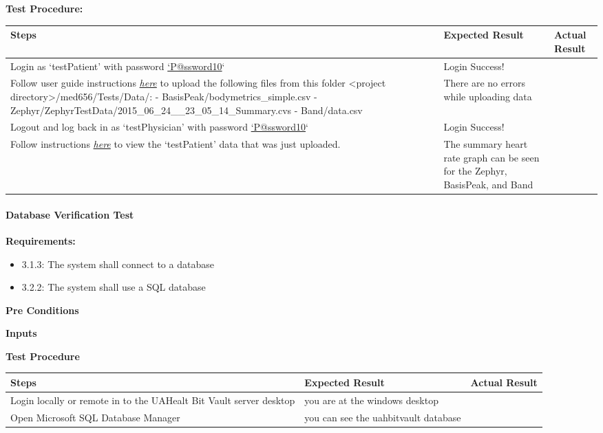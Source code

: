 \documentclass[letterpaper,10pt,english]{sphinxmanual}
\begin{document}
\textbf{Test Procedure:}

\begin{tabulary}{\linewidth}{|L|L|L|}
\hline
\textsf{\relax 
Steps
} & \textsf{\relax 
Expected Result
} & \textsf{\relax 
Actual Result
}\\
\hline
Login as `testPatient' with password \href{mailto:'P@ssword10}{`P@ssword10}`
 & 
Login Success!
 & \\
\hline
Follow user guide instructions {\hyperref[user_guide/patient_data_upload:patient-data-upload]{\emph{here}}} to
upload the following files from this folder
\textless{}project directory\textgreater{}/med656/Tests/Data/:
- BasisPeak/bodymetrics\_simple.csv
- Zephyr/ZephyrTestData/2015\_06\_24\_\_23\_05\_14\_Summary.cvs
- Band/data.csv
 & 
There are no errors while uploading data
 & \\
\hline
Logout and log back in as `testPhysician' with password \href{mailto:'P@ssword10}{`P@ssword10}`
 & 
Login Success!
 & \\
\hline
Follow instructions {\hyperref[user_guide/patient_data_view:view-patient-data-physician]{\emph{here}}} to view
the `testPatient' data that was just uploaded.
 & 
The summary heart rate graph can be seen
for the Zephyr, BasisPeak, and Band
 & \\
\hline\end{tabulary}



\paragraph{Database Verification Test}
\label{STD/manual_test_descriptions:database-verification-test}
\textbf{Requirements:}
\begin{itemize}
\item {} 
3.1.3: The system shall connect to a database

\item {} 
3.2.2: The system shall use a SQL database

\end{itemize}

\textbf{Pre Conditions}

\textbf{Inputs}

\textbf{Test Procedure}

\begin{tabulary}{\linewidth}{|L|L|L|}
\hline
\textsf{\relax 
Steps
} & \textsf{\relax 
Expected Result
} & \textsf{\relax 
Actual Result
}\\
\hline
Login locally or remote in to the UAHealt Bit Vault server desktop
 & 
you are at the windows desktop
 & \\
\hline
Open Microsoft SQL Database Manager
 & 
you can see the uahbitvault database
 & \\
\hline\end{tabulary}
\end{document}
